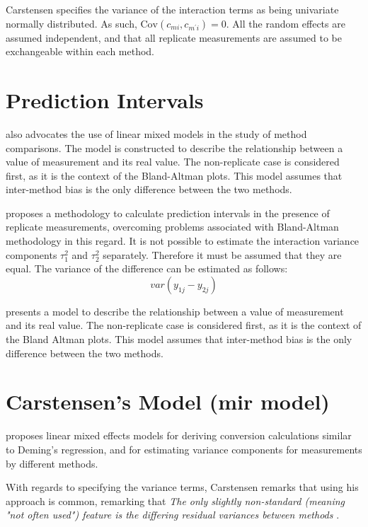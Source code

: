 \documentclass[12pt, a4paper]{report}
\theoremstyle{plain}
\theoremstyle{definition}
\theoremstyle{remark}
\begin{document}
Carstensen specifies the variance of the interaction terms as being univariate normally distributed. As such, $\mathrm{Cov}(c_{mi}, c_{m^\prime i})= 0.$ All the random effects are assumed independent, and that all replicate measurements are assumed to be exchangeable within each method.


\section{Prediction Intervals}
\citet{BXC2004} also advocates the use of linear mixed models in the study of method comparisons. The model is constructed to describe the relationship between a value of measurement and its real value. The non-replicate case is considered first, as it is the context of the Bland-Altman plots. This model assumes that inter-method bias is the only difference between the two methods. 

\citet{BXC2008} proposes a methodology to calculate prediction intervals in the presence of replicate measurements, overcoming
problems associated with Bland-Altman methodology in this regard. It is not possible to estimate the interaction variance components
$\tau^{2}_{1}$ and $\tau^{2}_{2}$ separately. Therefore it must be assumed that they are equal. The variance of the difference can be
estimated as follows:
\begin{equation}
var(y_{1j}-y_{2j})
\end{equation}


\citet{BXC2004} presents a model to describe the relationship between a value of measurement and its
real value. The non-replicate case is considered first, as it is the context of the Bland Altman plots. This model assumes that inter-method bias is the only difference between the two methods.



\section{Carstensen's Model (mir model)}


\citet{BXC2004} proposes linear mixed effects models for deriving conversion calculations similar to Deming's regression, and for
estimating variance components for measurements by different methods.


With regards to specifying the variance terms, Carstensen remarks that using his approach is common, remarking that \emph{
	The only slightly non-standard (meaning "not often used") feature is the differing residual variances between methods }\citep{BXC2010}.
\end{document}
